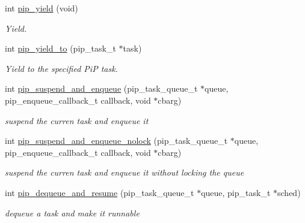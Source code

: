 \begin{DoxyCompactItemize}
\item 
int \hyperlink{group__libpip_gadcd0fdda9a09a0eac3001556cc1dd5e6}{pip\-\_\-yield} (void)
\begin{DoxyCompactList}\small\item\em Yield. \end{DoxyCompactList}\end{DoxyCompactItemize}
\begin{DoxyCompactItemize}
\item 
int \hyperlink{group__libpip_gac30cf124b28a8d80dac34c5e1bdb66ba}{pip\-\_\-yield\-\_\-to} (pip\-\_\-task\-\_\-t $\ast$task)
\begin{DoxyCompactList}\small\item\em Yield to the specified Pi\-P task. \end{DoxyCompactList}\end{DoxyCompactItemize}
\begin{DoxyCompactItemize}
\item 
int \hyperlink{group__libpip_ga7dbf7e64e78cd00ef62c3bb04f289a68}{pip\-\_\-suspend\-\_\-and\-\_\-enqueue} (pip\-\_\-task\-\_\-queue\-\_\-t $\ast$queue, pip\-\_\-enqueue\-\_\-callback\-\_\-t callback, void $\ast$cbarg)
\begin{DoxyCompactList}\small\item\em suspend the curren task and enqueue it \end{DoxyCompactList}\end{DoxyCompactItemize}
\begin{DoxyCompactItemize}
\item 
int \hyperlink{group__libpip_gab78d289ab89fa2981f2910849b1b2df7}{pip\-\_\-suspend\-\_\-and\-\_\-enqueue\-\_\-nolock} (pip\-\_\-task\-\_\-queue\-\_\-t $\ast$queue, pip\-\_\-enqueue\-\_\-callback\-\_\-t callback, void $\ast$cbarg)
\begin{DoxyCompactList}\small\item\em suspend the curren task and enqueue it without locking the queue \end{DoxyCompactList}\end{DoxyCompactItemize}
\begin{DoxyCompactItemize}
\item 
int \hyperlink{group__libpip_gaaff299f195e2397f17cf11016c8a394f}{pip\-\_\-dequeue\-\_\-and\-\_\-resume} (pip\-\_\-task\-\_\-queue\-\_\-t $\ast$queue, pip\-\_\-task\-\_\-t $\ast$sched)
\begin{DoxyCompactList}\small\item\em dequeue a task and make it runnable \end{DoxyCompactList}\end{DoxyCompactItemize}

